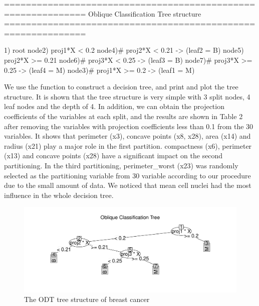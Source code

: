 \documentclass[nojss]{jss}
\newcommand{\fct}[1]{\code{#1()}}
\numberwithin{equation}{section}
\begin{document}
\begin{Schunk}
\begin{Soutput}
============================================================= 
Oblique Classification Tree structure 
=============================================================

1) root
   node2)  proj1*X < 0.2
      node4)# proj2*X < 0.21 -> (leaf2 = B)
      node5)  proj2*X >= 0.21
         node6)# proj3*X < 0.25 -> (leaf3 = B)
         node7)# proj3*X >= 0.25 -> (leaf4 = M)
   node3)# proj1*X >= 0.2 -> (leaf1 = M)
\end{Soutput}
\end{Schunk}
We use the function \fct{ODT} to construct a decision tree, and print and plot the tree structure. It is shown that the tree structure is very simple with 3 split nodes, 4 leaf nodes and the depth of 4. In addition, we can obtain the projection coefficients of the variables at each split, and the results are shown in Table 2 after removing the variables with projection coefficients less than 0.1 from the 30 variables. It shows that perimeter (x3), concave points (x8, x28), area (x14) and radius (x21) play a major role in the first partition. compactness (x6), perimeter (x13) and concave points (x28) have a significant impact on the second partitioning. In the third partitioning, perimeter\_worst (x23) was randomly selected as the partitioning variable from 30 variable according to our procedure due to the small amount of data. We noticed that mean cell nuclei had the most influence in the whole decision tree.
\begin{figure}[t!]
\centering
\includegraphics{ODRF-tree}
\caption{\label{fig:cancer.tree} The ODT tree structure of breast cancer}
\end{figure}
\end{document}
